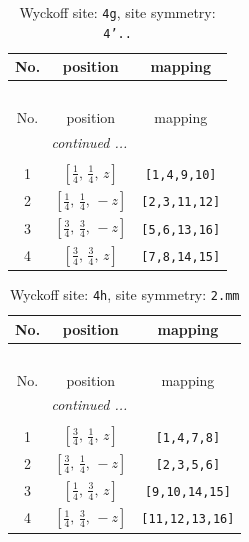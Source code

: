 \documentclass[fleqn,8pt]{jsarticle}
\begin{document}
\renewcommand{\arraystretch}{1.2}
\begin{longtable}{ccc}
\caption{Wyckoff site: {\tt 4g}, site symmetry: {\tt 4'..}}
 \\
 \hline \hline
No. & position & mapping \\ \hline \endfirsthead

\multicolumn{2}{l}{\tablename\ \thetable{}} \\
 \hline \hline
No. & position & mapping \\ \hline \endhead

 \hline \hline
\multicolumn{2}{r}{\footnotesize\it continued ...} \\ \endfoot

 \hline \hline
\multicolumn{2}{r}{} \\ \endlastfoot

1 & $\left[ \frac{1}{4},\, \frac{1}{4},\, z \right]$ & {\tt [1,4,9,10]} \\ \hline
2 & $\left[ \frac{1}{4},\, \frac{1}{4},\, - z \right]$ & {\tt [2,3,11,12]} \\ \hline
3 & $\left[ \frac{3}{4},\, \frac{3}{4},\, - z \right]$ & {\tt [5,6,13,16]} \\ \hline
4 & $\left[ \frac{3}{4},\, \frac{3}{4},\, z \right]$ & {\tt [7,8,14,15]} \\
\end{longtable}
\renewcommand{\arraystretch}{1.2}
\begin{longtable}{ccc}
\caption{Wyckoff site: {\tt 4h}, site symmetry: {\tt 2.mm}}
 \\
 \hline \hline
No. & position & mapping \\ \hline \endfirsthead

\multicolumn{2}{l}{\tablename\ \thetable{}} \\
 \hline \hline
No. & position & mapping \\ \hline \endhead

 \hline \hline
\multicolumn{2}{r}{\footnotesize\it continued ...} \\ \endfoot

 \hline \hline
\multicolumn{2}{r}{} \\ \endlastfoot

1 & $\left[ \frac{3}{4},\, \frac{1}{4},\, z \right]$ & {\tt [1,4,7,8]} \\ \hline
2 & $\left[ \frac{3}{4},\, \frac{1}{4},\, - z \right]$ & {\tt [2,3,5,6]} \\ \hline
3 & $\left[ \frac{1}{4},\, \frac{3}{4},\, z \right]$ & {\tt [9,10,14,15]} \\ \hline
4 & $\left[ \frac{1}{4},\, \frac{3}{4},\, - z \right]$ & {\tt [11,12,13,16]} \\
\end{longtable}
\end{document}
